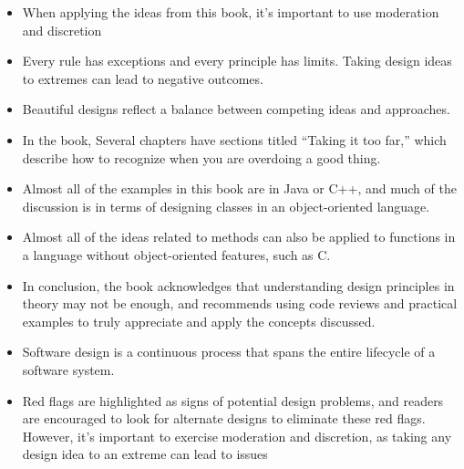 { 
	
	
	\begin{itemize}
		\item When applying the ideas from this book, it’s important to use moderation and discretion
		
	\item	Every rule has exceptions and every principle has limits. Taking design ideas to extremes can lead to negative outcomes. 
		
	\item	Beautiful designs reflect a balance between competing ideas and approaches.
		
	\item	In the book, Several chapters have sections titled “Taking it too far,” which describe how to recognize when you are overdoing a good thing.
	
	\item	Almost all of the examples in this book are in Java or C++, and much of the discussion is in terms of designing classes in an object-oriented language. 
	 
	\item	Almost all of the ideas related to methods can also be applied to functions in a language without object-oriented features, such as C.
	
		
		
		
		
	\end{itemize}
}


{ 
	
	
	\begin{itemize}
		\item In conclusion, the book acknowledges that understanding design principles in theory may not be enough, and recommends using code reviews and practical examples to truly appreciate and apply the concepts discussed. 
		
	\item	Software design is a continuous process that spans the entire lifecycle of a software system.
		
	\item	Red flags are highlighted as signs of potential design problems, and readers are encouraged to look for alternate designs to eliminate these red flags. However, it's important to exercise moderation and discretion, as taking any design idea to an extreme can lead to issues
		
		
		
	\end{itemize}
}

